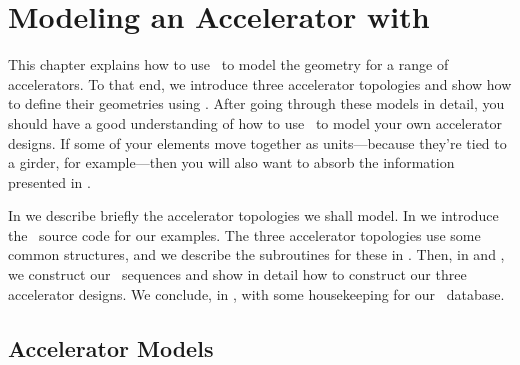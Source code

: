 \makeusother
{}

\chapter{Modeling an Accelerator with \PTC}
\label{cha:model.accel}


%
This chapter explains how to use \PTC\ to model the geometry for a
range of accelerators. To that end, we introduce three accelerator
topologies and show how to define their geometries using \PTC. After
going through these models in detail, you should have a good
understanding of how to use \PTC\ to model your own accelerator
designs. If some of your elements move together as units---because
they're tied to a girder, for example---then you will also want to
absorb the information presented in .

In  we describe briefly the accelerator topologies
we shall model. In  we introduce the \PTC\ source code
for our examples. The three accelerator topologies use some common
structures, and we describe the subroutines for these in
. Then, in  and ,
we construct our \DNA\ sequences and show in detail how to construct
our three accelerator designs. We conclude, in , with
some housekeeping
for our \DNA\ database.




\section{Accelerator Models}
\label{sec:accel.models}

